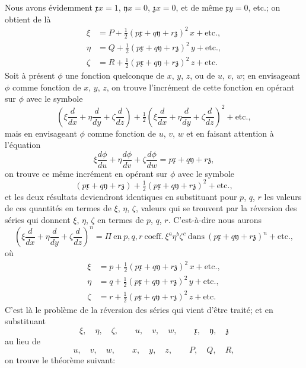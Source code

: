 \documentclass[11pt,a4paper]{book}
\theoremstyle{plain}
\begin{document}
Nous avons \'{e}videmment $\mathfrak{x}x=1$, $\mathfrak{y}x=0$, $\mathfrak{z}x=0$, et de m\^{e}me $\mathfrak{x}y=0$, etc.; on obtient de l\`{a}
\begin{align*}
\xi &= P+\tfrac{1}{2}(p\mathfrak{x}+q\mathfrak{y}+r\mathfrak{z})^2\,x+\text{etc.},\\
\eta &= Q+\tfrac{1}{2}(p\mathfrak{x}+q\mathfrak{y}+r\mathfrak{z})^2\,y+\text{etc.},\\
\zeta &= R+\tfrac{1}{2}(p\mathfrak{x}+q\mathfrak{y}+r\mathfrak{z})^2\,z+\text{etc.}
\end{align*}
Soit \`{a} pr\'{e}sent $\phi$ une fonction quelconque de $x$, $y$, $z$, ou de $u$, $v$, $w$; en envisageant $\phi$ comme fonction de $x$, $y$, $z$, on trouve l'incr\'{e}ment de cette fonction en op\'{e}rant sur $\phi$ avec le symbole
\[
\left(\xi\frac{d}{dx}+\eta\frac{d}{dy}+\zeta\frac{d}{dz}\right)+\tfrac{1}{2}\left(\xi\frac{d}{dx}+\eta\frac{d}{dy}+\zeta\frac{d}{dz}\right)^2+\text{etc.},
\]
mais en envisageant $\phi$ comme fonction de $u$, $v$, $w$ et en faisant attention \`{a} l'\'{e}quation
\[
\xi\frac{d\phi}{du}+\eta\frac{d\phi}{dv}+\zeta\frac{d\phi}{dw}=p\mathfrak{x}+q\mathfrak{y}+r\mathfrak{z},
\]
on trouve ce m\^{e}me incr\'{e}ment en op\'{e}rant sur $\phi$ avec le symbole
\[
(p\mathfrak{x}+q\mathfrak{y}+r\mathfrak{z})+\tfrac{1}{2}(p\mathfrak{x}+q\mathfrak{y}+r\mathfrak{z})^2+\text{etc.},
\]
et les deux r\'{e}sultats deviendront identiques en substituant pour $p$, $q$, $r$ les valeurs de ces quantit\'{e}s en termes de $\xi$, $\eta$, $\zeta$, valeurs qui se trouvent par la r\'{e}version des s\'{e}ries qui donnent $\xi$, $\eta$, $\zeta$ en termes de $p$, $q$, $r$. C'est-\`{a}-dire nous aurons
\[
\left(\xi\frac{d}{dx}+\eta\frac{d}{dy}+\zeta\frac{d}{dz}\right)^n=\Pi\ \text{en}\ p, q, r\ \text{coeff.}\ \xi^a\eta^b\zeta^c\ \text{dans}\ (p\mathfrak{x}+q\mathfrak{y}+r\mathfrak{z})^n+\text{etc.},
\]
o\`{u}
\begin{align*}
\xi &= p+\tfrac{1}{2}(p\mathfrak{x}+q\mathfrak{y}+r\mathfrak{z})^2\,x+\text{etc.},\\
\eta &= q+\tfrac{1}{2}(p\mathfrak{x}+q\mathfrak{y}+r\mathfrak{z})^2\,y+\text{etc.},\\
\zeta &= r+\tfrac{1}{2}(p\mathfrak{x}+q\mathfrak{y}+r\mathfrak{z})^2\,z+\text{etc.}
\end{align*}
C'est l\`{a} le probl\`{e}me de la r\'{e}version des s\'{e}ries qui vient d'\^{e}tre trait\'{e}; et en substituant
\[
\xi,\quad \eta,\quad \zeta,\qquad u,\quad v,\quad w,\qquad \mathfrak{x},\quad \mathfrak{y},\quad \mathfrak{z}
\]
au lieu de
\[
u,\quad v,\quad w,\qquad x,\quad y,\quad z,\qquad P,\quad Q,\quad R,
\]
on trouve le th\'{e}or\`{e}me suivant:
\end{document}
